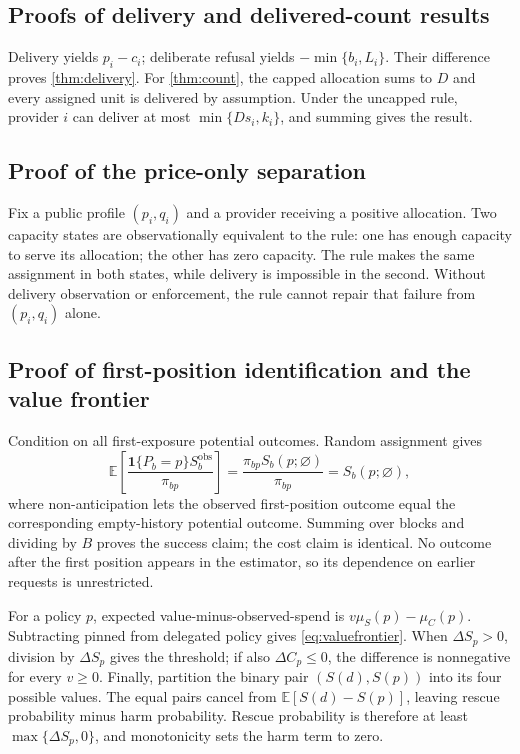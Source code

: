 \documentclass[11pt]{article}
\theoremstyle{definition}
\newcommand{\E}{\mathbb{E}}
\begin{document}
\subsection{Proofs of delivery and delivered-count results}
Delivery yields $p_i-c_i$; deliberate refusal yields
$-\min\{b_i,L_i\}$. Their difference proves \cref{thm:delivery}. For
\cref{thm:count}, the capped allocation sums to $D$ and every assigned unit is
delivered by assumption. Under the uncapped rule, provider $i$ can deliver at
most $\min\{Ds_i,k_i\}$, and summing gives the result.

\subsection{Proof of the price-only separation}
Fix a public profile $(p_i,q_i)$ and a provider receiving a positive
allocation. Two capacity states are observationally equivalent to the rule:
one has enough capacity to serve its allocation; the other has zero capacity.
The rule makes the same assignment in both states, while delivery is impossible
in the second. Without delivery observation or enforcement, the rule cannot
repair that failure from $(p_i,q_i)$ alone.

\subsection{Proof of first-position identification and the value frontier}
Condition on all first-exposure potential outcomes. Random assignment gives
\[
 \E\left[\frac{\mathbf 1\{P_b=p\}S_b^{\mathrm{obs}}}{\pi_{bp}}\right]
 =\frac{\pi_{bp}S_b(p;\varnothing)}{\pi_{bp}}
 =S_b(p;\varnothing),
\]
where non-anticipation lets the observed first-position outcome equal the
corresponding empty-history potential outcome. Summing over blocks and dividing
by $B$ proves the success claim; the cost claim is identical. No outcome after
the first position appears in the estimator, so its dependence on earlier
requests is unrestricted.

For a policy $p$, expected value-minus-observed-spend is
$v\mu_S(p)-\mu_C(p)$. Subtracting pinned from delegated policy gives
\cref{eq:valuefrontier}. When $\Delta S_p>0$, division by $\Delta S_p$ gives
the threshold; if also $\Delta C_p\leq0$, the difference is nonnegative for
every $v\geq0$. Finally, partition the binary pair $(S(d),S(p))$ into its four
possible values. The equal pairs cancel from
$\E[S(d)-S(p)]$, leaving rescue probability minus harm probability. Rescue
probability is therefore at least $\max\{\Delta S_p,0\}$, and monotonicity
sets the harm term to zero.
\end{document}
